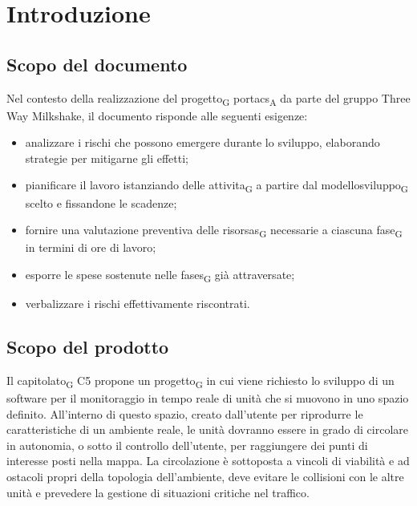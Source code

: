 \section{Introduzione}




\subsection{Scopo del documento}

Nel contesto della realizzazione del \gls{progetto}\textsubscript{G} \acrshort{portacs}\textsubscript{A} da parte del gruppo Three Way Milkshake, il documento risponde alle seguenti esigenze: 
\begin{itemize}
	\item analizzare i rischi che possono emergere durante lo sviluppo, elaborando strategie per mitigarne gli effetti;
	\item pianificare il lavoro istanziando delle \gls{attivita}\textsubscript{G} a partire dal \gls{modellosviluppo}\textsubscript{G} scelto e fissandone le scadenze;
	\item fornire una valutazione preventiva delle \glspl{risorsa}\textsubscript{G} necessarie a ciascuna \gls{fase}\textsubscript{G} in termini di ore di lavoro;
	\item esporre le spese sostenute nelle \glspl{fase}\textsubscript{G} già attraversate;
	\item verbalizzare i rischi effettivamente riscontrati.
\end{itemize}



\subsection{Scopo del prodotto}

Il \gls{capitolato}\textsubscript{G} C5 propone un \gls{progetto}\textsubscript{G} in cui viene richiesto lo sviluppo di un software per il monitoraggio in tempo reale di unità che si muovono in uno spazio definito. All’interno di questo spazio, creato dall’utente per riprodurre le caratteristiche di un ambiente reale, le unità dovranno essere in grado di circolare in autonomia, o sotto il controllo dell’utente, per raggiungere dei punti di interesse posti nella mappa.  La circolazione è sottoposta a vincoli di viabilità e ad ostacoli propri della topologia dell’ambiente, deve evitare le collisioni con le altre unità e prevedere la gestione di situazioni critiche nel traffico.




